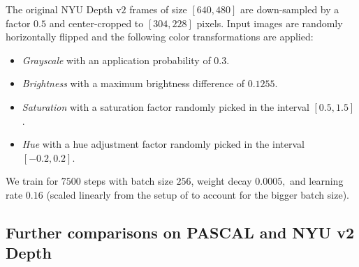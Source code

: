The original NYU Depth v$2$ frames of size $\left[640, 480\right]$ are down-sampled by a factor $0.5$ and center-cropped to $\left[304, 228\right]$ pixels. Input images are randomly horizontally flipped and the following color transformations are applied:
\begin{itemize}
\item \textit{Grayscale} with an application  probability of $0.3$.
\item \textit{Brightness} with a maximum brightness difference of $0.1255$.
\item \textit{Saturation} with a saturation factor randomly picked in the interval $\left[0.5, 1.5\right]$.
\item \textit{Hue} with a hue adjustment factor randomly picked in the interval $\left[-0.2, 0.2\right]$.
\end{itemize}
We train for $7500$ steps with batch size $256$, weight decay $0.0005,$ and learning rate $0.16$ (scaled linearly from the setup of \cite{laina2016depth} to account for the bigger batch size).

\subsection{Further comparisons on PASCAL and NYU v2 Depth}

